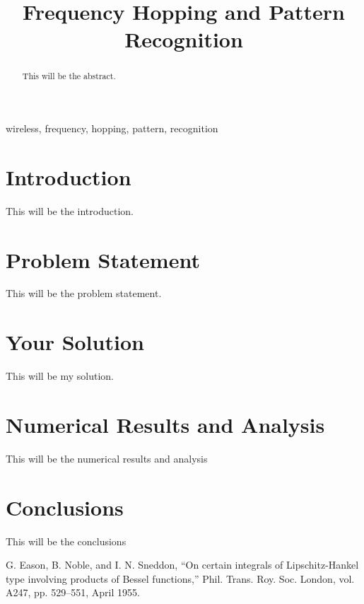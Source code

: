 \documentclass[conference]{IEEEtran}
\begin{document}
\title{Frequency Hopping and Pattern Recognition}

\author{
}

\maketitle

\begin{abstract}
This will be the abstract.
\end{abstract}

\begin{IEEEkeywords}
wireless, frequency, hopping, pattern, recognition
\end{IEEEkeywords}

\section{Introduction}
This will be the introduction.

\section{Problem Statement}

This will be the problem statement.



\section{Your Solution}
This will be my solution.

\section{Numerical Results and Analysis}
This will be the numerical results and analysis

\section{Conclusions}
This will be the conclusions


\begin{thebibliography}{00}
 G. Eason, B. Noble, and I. N. Sneddon, ``On certain integrals of Lipschitz-Hankel type involving products of Bessel functions,'' Phil. Trans. Roy. Soc. London, vol. A247, pp. 529--551, April 1955.

\end{thebibliography}
\end{document}
